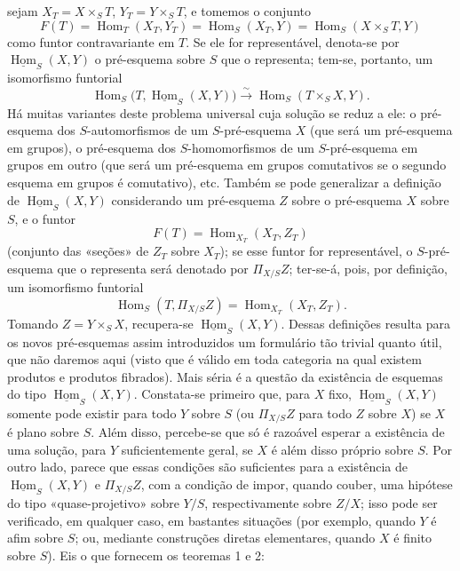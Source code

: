 sejam $X_T=X\times_ST$, $Y_T=Y\times_ST$, e tomemos o conjunto
\[
  F(T)=\operatorname{Hom}_T(X_T,Y_T)
      =\operatorname{Hom}_S(X_T,Y)
      =\operatorname{Hom}_S(X\times_ST,Y)
\]
como funtor contravariante em $T$. Se ele for representável, denota-se por
$\underline{\operatorname{Hom}}_S(X,Y)$ o pré-esquema sobre $S$ que o
representa; tem-se, portanto, um isomorfismo funtorial
\[
  \operatorname{Hom}_S
  \bigl(T,\underline{\operatorname{Hom}}_S(X,Y)\bigr)
  \xrightarrow{\sim}
  \operatorname{Hom}_S(T\times_SX,Y).
\]
Há muitas variantes deste problema universal cuja solução se reduz a ele:
o pré-esquema dos $S$-automorfismos de um $S$-pré-esquema $X$ (que será um
pré-esquema em grupos), o pré-esquema dos $S$-homomorfismos de um
$S$-pré-esquema em grupos em outro (que será um pré-esquema em grupos comutativos
se o segundo esquema em grupos é comutativo), etc. Também se pode
generalizar a definição de $\underline{\operatorname{Hom}}_S(X,Y)$
considerando um pré-esquema $Z$ sobre o pré-esquema $X$ sobre $S$, e o funtor
\[
  F(T)=\operatorname{Hom}_{X_T}(X_T,Z_T)
\]
(conjunto das «seções» de $Z_T$ sobre $X_T$); se esse funtor for
representável, o $S$-pré-esquema que o representa será denotado por
$\Pi_{X/S}Z$; ter-se-á, pois, por definição, um isomorfismo funtorial
\[
  \operatorname{Hom}_S(T,\Pi_{X/S}Z)
  =\operatorname{Hom}_{X_T}(X_T,Z_T).
\]
Tomando $Z=Y\times_SX$, recupera-se
$\underline{\operatorname{Hom}}_S(X,Y)$. Dessas definições resulta para os
novos pré-esquemas assim introduzidos um formulário tão trivial quanto útil, que não
daremos aqui (visto que é válido em toda categoria na qual existem
produtos e produtos fibrados). Mais séria é a questão da existência de
esquemas do tipo $\underline{\operatorname{Hom}}_S(X,Y)$. Constata-se primeiro
que, para $X$ fixo, $\underline{\operatorname{Hom}}_S(X,Y)$ somente pode existir
para todo $Y$ sobre $S$ (ou $\Pi_{X/S}Z$ para todo $Z$ sobre $X$) se $X$ é plano
sobre $S$. Além disso, percebe-se que só é razoável esperar a existência de
uma solução, para $Y$ suficientemente geral, se $X$ é além disso próprio sobre
$S$. Por outro lado, parece que essas condições são suficientes para a
existência de $\underline{\operatorname{Hom}}_S(X,Y)$ e $\Pi_{X/S}Z$, com a
condição de impor, quando couber, uma hipótese do tipo «quase-projetivo»
sobre $Y/S$, respectivamente sobre $Z/X$; isso pode ser verificado, em qualquer
caso, em bastantes situações (por exemplo, quando $Y$ é afim sobre $S$; ou,
mediante construções diretas elementares, quando $X$ é finito sobre $S$).
Eis o que fornecem os teoremas 1 e 2:

